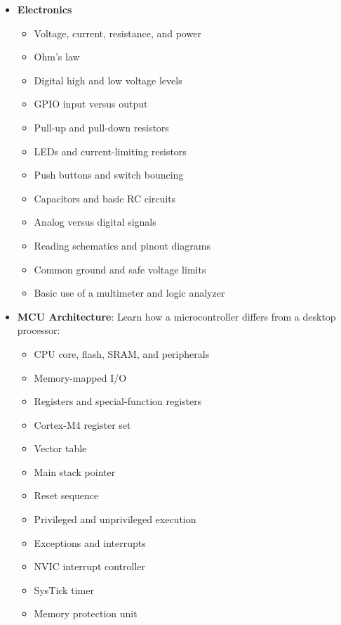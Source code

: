 \documentclass{report}
\begin{document}
    \begin{itemize}
        \item \textbf{Electronics}
            \begin{itemize}
                \item Voltage, current, resistance, and power
                \item Ohm’s law
                \item Digital high and low voltage levels
                \item GPIO input versus output
                \item Pull-up and pull-down resistors
                \item LEDs and current-limiting resistors
                \item Push buttons and switch bouncing
                \item Capacitors and basic RC circuits
                \item Analog versus digital signals
                \item Reading schematics and pinout diagrams
                \item Common ground and safe voltage limits
                \item Basic use of a multimeter and logic analyzer
            \end{itemize}
        \item \textbf{MCU Architecture}: Learn how a microcontroller differs from a desktop processor: 
            \begin{itemize}
                \item CPU core, flash, SRAM, and peripherals
                \item Memory-mapped I/O
                \item Registers and special-function registers
                \item Cortex-M4 register set
                \item Vector table
                \item Main stack pointer
                \item Reset sequence
                \item Privileged and unprivileged execution
                \item Exceptions and interrupts
                \item NVIC interrupt controller
                \item SysTick timer
                \item Memory protection unit

\end{itemize}
\end{itemize}
\end{document}
